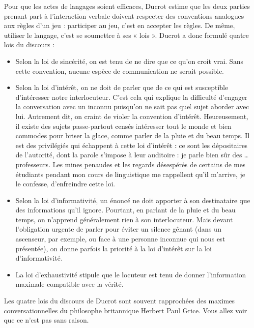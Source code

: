 Pour que les actes de langages soient efficaces, Ducrot estime que les deux parties prenant part à l’interaction verbale doivent respecter des conventions analogues aux règles d’un jeu : participer au jeu, c’est en accepter les règles. De même, utiliser le langage, c’est se soumettre à ses « lois ». Ducrot a donc formulé quatre lois du discours :
\begin{itemize}
\item Selon la loi de sincérité, on est tenu de ne dire que ce qu’on croit vrai. Sans cette convention, aucune espèce de communication ne serait possible.
\end{itemize}
\begin{itemize}
\item Selon la loi d’intérêt, on ne doit de parler que de ce qui est susceptible d’intéresser notre interlocuteur. C’est cela qui explique la difficulté d’engager la conversation avec un inconnu puisqu’on ne sait pas quel sujet aborder avec lui. Autrement dit, on craint de violer la convention d’intérêt. Heureusement, il existe des sujets passe-partout censés intéresser tout le monde et bien commodes pour briser la glace, comme parler de la pluie et du beau temps. Il est des privilégiés qui échappent à cette loi d’intérêt : ce sont les dépositaires de l’autorité, dont la parole s’impose à leur auditoire : je parle bien sûr des … professeurs. Les mines penaudes et les regards désespérés de certains de mes étudiants pendant mon cours de linguistique me rappellent qu’il m’arrive, je le confesse, d’enfreindre cette loi.
\item Selon la loi d’informativité, un énoncé ne doit apporter à son destinataire que des informations qu’il ignore. Pourtant, en parlant de la pluie et du beau temps, on n’apprend généralement rien à son interlocuteur. Mais devant l’obligation urgente de parler pour éviter un silence gênant (dans un ascenseur, par exemple, ou face à une personne inconnue qui nous est présentée), on donne parfois la priorité à la loi d’intérêt sur la loi d’informativité.
\item La loi d’exhaustivité stipule que le locuteur est tenu de donner l’information maximale compatible avec la vérité.
\end{itemize}
Les quatre lois du discours de Ducrot sont souvent rapprochées des maximes conversationnelles du philosophe britannique Herbert Paul Grice. Vous allez voir que ce n’est pas sans raison.

